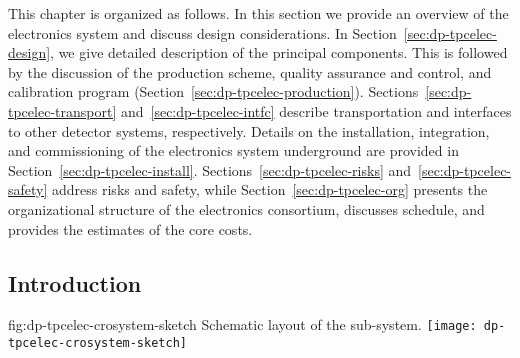 This chapter is organized as follows. In this section we provide an overview of the   electronics system and discuss design considerations. In Section~\ref{sec:dp-tpcelec-design}, we give detailed description of the principal components. This is followed by the discussion of the production scheme, quality assurance and control, and calibration program (Section~\ref{sec:dp-tpcelec-production}). Sections~\ref{sec:dp-tpcelec-transport} and~\ref{sec:dp-tpcelec-intfc} describe transportation and interfaces to other detector systems, respectively. Details on the installation, integration, and commissioning of the   electronics system underground are provided in Section~\ref{sec:dp-tpcelec-install}. Sections~\ref{sec:dp-tpcelec-risks} and~\ref{sec:dp-tpcelec-safety} address risks and safety, while Section~\ref{sec:dp-tpcelec-org} presents the organizational structure of the   electronics consortium, discusses schedule, and provides the estimates of the core costs. 


\subsection{Introduction}
\label{ssec:dp-tpcelec-intro}

\begin{dunefigure}{fig:dp-tpcelec-crosystem-sketch}
{Schematic layout of the   sub-system.}
\texttt{[image: dp-tpcelec-crosystem-sketch]}
\end{dunefigure}

